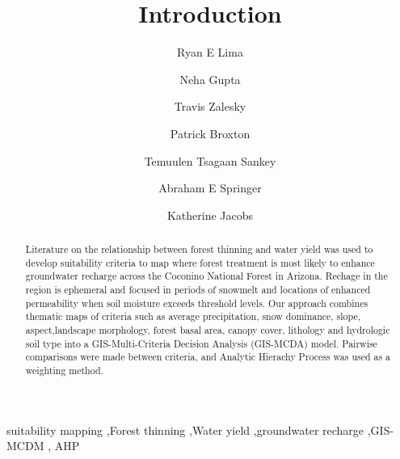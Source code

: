 \documentclass[
  number,
  preprint,
  3p,
  onecolumn]{elsarticle}
\begin{document}
\begin{frontmatter}
\title{Introduction}
\author[1]{Ryan E Lima%
%
}
\author[2]{Neha Gupta%
%
}

\author[2]{Travis Zalesky%
%
}

\author[2]{Patrick Broxton%
%
}

\author[1]{Temuulen Tsagaan Sankey%
%
}

\author[1]{Abraham E Springer%
%
}

\author[2]{Katherine Jacobs%
%
}










        
\begin{abstract}
Literature on the relationship between forest thinning and water yield
was used to develop suitability criteria to map where forest treatment
is most likely to enhance groundwater recharge across the Coconino
National Forest in Arizona. Rechage in the region is ephemeral and
focused in periods of snowmelt and locations of enhanced permeability
when soil moisture exceeds threshold levels. Our approach combines
thematic maps of criteria such as average precipitation, snow dominance,
slope, aspect,landscape morphology, forest basal area, canopy cover,
lithology and hydrologic soil type into a GIS-Multi-Criteria Decision
Analysis (GIS-MCDA) model. Pairwise comparisons were made between
criteria, and Analytic Hierachy Process was used as a weighting method.
\end{abstract}





\begin{keyword}
    suitability mapping \sep Forest thinning \sep Water
yield \sep groundwater recharge \sep GIS-MCDM \sep 
    AHP
\end{keyword}
\end{frontmatter}
    
\end{document}
